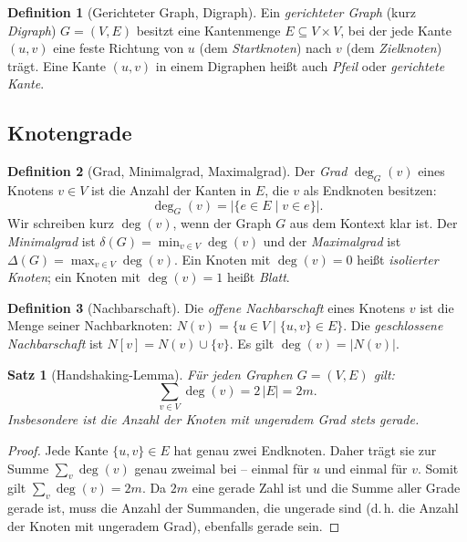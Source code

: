 ﻿\documentclass[a4paper,12pt,openany,oneside]{book}
\theoremstyle{definition}
\newtheorem{definition}{Definition}[chapter]
\theoremstyle{plain}
\newtheorem{satz}{Satz}[chapter]
\theoremstyle{remark}
\begin{document}
\begin{definition}[Gerichteter Graph, Digraph]
  Ein \emph{gerichteter Graph} (kurz \emph{Digraph}) $G = (V, E)$ besitzt
  eine Kantenmenge $E \subseteq V \times V$, bei der jede Kante $(u,v)$ eine
  feste Richtung von $u$ (dem \emph{Startknoten}) nach $v$ (dem
  \emph{Zielknoten}) tr\"agt. Eine Kante $(u,v)$ in einem Digraphen hei\ss{}t
  auch \emph{Pfeil} oder \emph{gerichtete Kante}.
\end{definition}

\subsection{Knotengrade}

\begin{definition}[Grad, Minimalgrad, Maximalgrad]
  Der \emph{Grad} $\deg_G(v)$ eines Knotens $v \in V$ ist die Anzahl der
  Kanten in $E$, die $v$ als Endknoten besitzen:
  \[
    \deg_G(v) = \bigl|\{ e \in E \mid v \in e \}\bigr|.
  \]
  Wir schreiben kurz $\deg(v)$, wenn der Graph $G$ aus dem Kontext klar ist.
  Der \emph{Minimalgrad} ist $\delta(G) = \min_{v \in V} \deg(v)$ und der
  \emph{Maximalgrad} ist $\Delta(G) = \max_{v \in V} \deg(v)$.
  Ein Knoten mit $\deg(v) = 0$ hei\ss{}t \emph{isolierter Knoten}; ein Knoten
  mit $\deg(v) = 1$ hei\ss{}t \emph{Blatt}.
\end{definition}

\begin{definition}[Nachbarschaft]
  Die \emph{offene Nachbarschaft} eines Knotens $v$ ist die Menge seiner
  Nachbarknoten: $N(v) = \{ u \in V \mid \{u,v\} \in E \}$. Die
  \emph{geschlossene Nachbarschaft} ist $N[v] = N(v) \cup \{v\}$.
  Es gilt $\deg(v) = |N(v)|$.
\end{definition}

\begin{satz}[Handshaking-Lemma]
  \label{satz:handshaking}
  F\"ur jeden Graphen $G = (V, E)$ gilt:
  \[
    \sum_{v \in V} \deg(v) = 2\,|E| = 2m.
  \]
  Insbesondere ist die Anzahl der Knoten mit ungeradem Grad stets gerade.
\end{satz}

\begin{proof}
  Jede Kante $\{u,v\} \in E$ hat genau zwei Endknoten. Daher tr\"agt sie zur
  Summe $\sum_{v} \deg(v)$ genau zweimal bei -- einmal f\"ur $u$ und einmal
  f\"ur $v$. Somit gilt $\sum_{v} \deg(v) = 2m$. Da $2m$ eine gerade Zahl ist
  und die Summe aller Grade gerade ist, muss die Anzahl der Summanden, die
  ungerade sind (d.\,h. die Anzahl der Knoten mit ungeradem Grad), ebenfalls
  gerade sein.
\end{proof}
\end{document}
